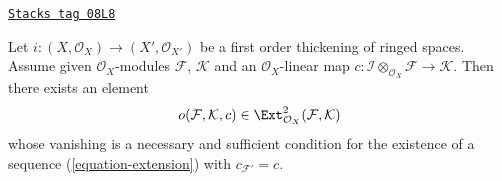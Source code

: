 \begin{lemma}
\label{defos-lemma-inf-obs-ext}
\href{https://stacks.math.columbia.edu/tag/08L8}{\texttt{Stacks tag 08L8}}

Let $i : (X, \mathcal{O}_X) \to (X', \mathcal{O}_{X'})$
be a first order thickening of ringed spaces. Assume given
$\mathcal{O}_X$-modules $\mathcal{F}$, $\mathcal{K}$
and an $\mathcal{O}_X$-linear map
$c : \mathcal{I} \otimes_{\mathcal{O}_X} \mathcal{F} \to \mathcal{K}$.
Then there exists an element
$$
o(\mathcal{F}, \mathcal{K}, c) \in
\Ext^2_{\mathcal{O}_X}(\mathcal{F}, \mathcal{K})
$$
whose vanishing is a necessary and sufficient condition for the existence
of a sequence (\ref{equation-extension}) with $c_{\mathcal{F}'} = c$.
\end{lemma}

